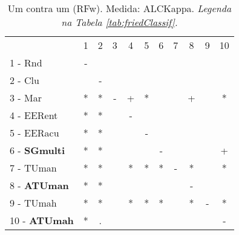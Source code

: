 \begin{table}[h]
\caption{Um contra um (RFw). Medida: ALCKappa. \textit{Legenda na Tabela \ref{tab:friedClassif}.}}
\begin{center}\begin{tabular}{lcc|cc|cc|cc|cc}
 			& 1 & 2 & 3 & 4 & 5 & 6 & 7 & 8 & 9 & 10\\
1 - Rnd  	& - &   &   &   &   &   &   &   &   &   \\
2 - Clu  	&   & - &   &   &   &   &   &   &   &   \\ \hline
3 - Mar  	& * & * & - & + & * &   &   & + &   & * \\
4 - EERent	& * & * &   & - &   &   &   &   &   &   \\ \hline
5 - EERacu	& * & * &   &   & - &   &   &   &   &   \\
6 - \textbf{SGmulti}	& * & * &   &   &   & - &   &   &   & + \\ \hline
7 - TUman	& * & * &   & * & * & * & - & * &   & * \\
8 - \textbf{ATUman}	& * & * &   &   &   &   &   & - &   &   \\ \hline
9 - TUmah	& * & * &   & * & * & * &   & * & - & * \\
10 - \textbf{ATUmah}	& * & . &   &   &   &   &   &   &   & - \\ \hline\end{tabular}
\label{stratsALCKappaFriedRFwRedux}
\end{center}
\end{table}